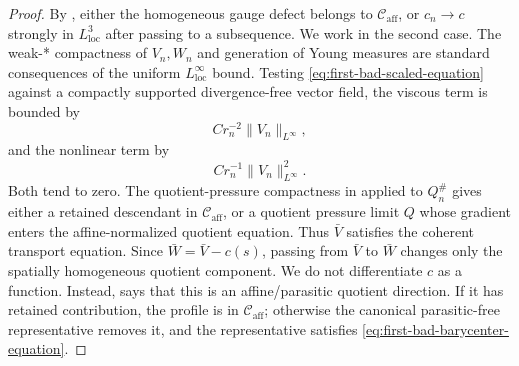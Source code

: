 \documentclass[11pt]{amsart}
\numberwithin{equation}{section}
\theoremstyle{plain}
\theoremstyle{definition}
\theoremstyle{remark}
\newcommand{\loc}{\mathrm{loc}}
\newcommand{\Caff}{\mathcal C_{\mathrm{aff}}}
\begin{document}
\begin{proof}
By , either the homogeneous gauge
defect belongs to \(\Caff\), or \(c_n\to c\) strongly in \(L^3_{\loc}\) after
passing to a subsequence.  We work in the second case.
The weak-* compactness of \(V_n,W_n\) and generation of Young measures are
standard consequences of the uniform \(L^\infty_{\loc}\) bound.  Testing
\eqref{eq:first-bad-scaled-equation} against a compactly supported
divergence-free vector field, the viscous term is bounded by
\[
   Cr_n^{-2}\|V_n\|_{L^\infty},
\]
and the nonlinear term by
\[
   Cr_n^{-1}\|V_n\|_{L^\infty}^2.
\]
Both tend to zero.  The quotient-pressure compactness in
 applied to \(Q_n^\#\) gives either a
retained descendant in \(\Caff\), or a quotient pressure limit \(Q\) whose
gradient enters the affine-normalized quotient equation.
Thus \(\bar V\) satisfies the coherent transport equation.  Since
\(\bar W=\bar V-c(s)\), passing from \(\bar V\) to \(\bar W\) changes only the
spatially homogeneous quotient component.  We do not differentiate \(c\) as a
function.  Instead,  says that this is
an affine/parasitic quotient direction.  If it has retained contribution, the profile
is in \(\Caff\); otherwise the canonical parasitic-free representative removes
it, and the representative satisfies
\eqref{eq:first-bad-barycenter-equation}.


\end{proof}
\end{document}
